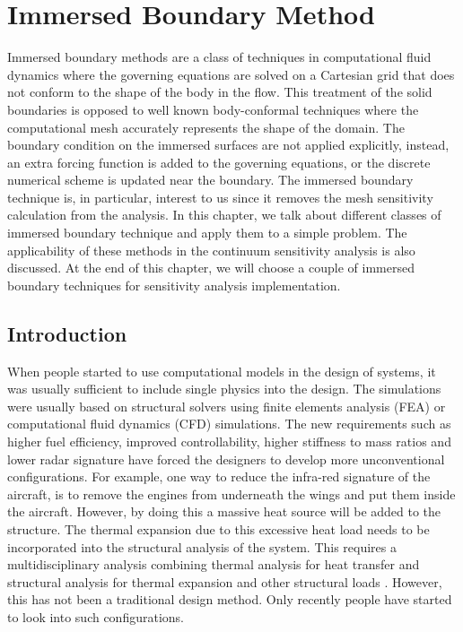 \chapter{Immersed Boundary Method}\label{ch:immersedBoundary}
Immersed boundary methods are a class of techniques in computational fluid dynamics where the governing equations are solved on a Cartesian grid that does not conform to the shape of the body in the flow. This treatment of the solid boundaries is opposed to well known body-conformal techniques where the computational mesh accurately represents the shape of the domain. The boundary condition on the immersed surfaces are not applied explicitly, instead, an extra forcing function is added to the governing equations, or the discrete numerical scheme is updated near the boundary. The immersed boundary technique is, in particular, interest to us since it removes the mesh sensitivity calculation from the analysis. In this chapter, we talk about different classes of immersed boundary technique and apply them to a simple problem. The applicability of these methods in the continuum sensitivity analysis is also discussed. At the end of this chapter, we will choose a couple of immersed boundary techniques for sensitivity analysis implementation.

\section{Introduction}
When people started to use computational models in the design of systems, it was usually sufficient to include single physics into the design. The simulations were usually based on structural solvers using finite elements analysis (FEA) or computational fluid dynamics (CFD) simulations. The new requirements such as higher fuel efficiency, improved controllability, higher stiffness to mass ratios and lower radar signature have forced the designers to develop more unconventional configurations. For example, one way to reduce the infra-red signature of the aircraft, is to remove the engines from underneath the wings and put them inside the aircraft. However, by doing this a massive heat source will be added to the structure. The thermal expansion due to this excessive heat load needs to be incorporated into the structural analysis of the system. This requires a multidisciplinary analysis combining thermal analysis for heat transfer and structural analysis for thermal expansion and other structural loads \cite{deaton2013stiffening}. However, this has not been a traditional design method. Only recently people have started to look into such configurations.


